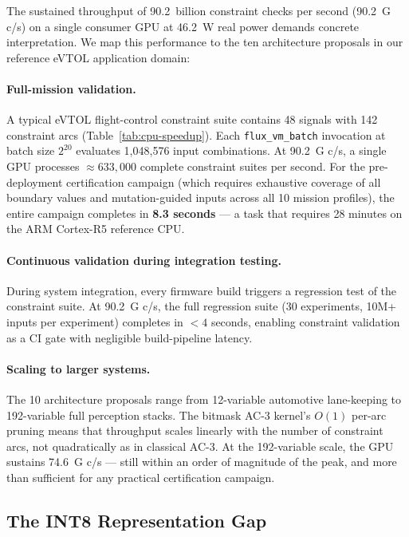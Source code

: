 \documentclass[conference]{IEEEtran}
\begin{document}
{The sustained throughput of 90.2~billion constraint checks per second
(90.2~G c/s) on a single consumer GPU at 46.2~W real power demands
concrete interpretation. We map this performance to the ten architecture
proposals in our reference eVTOL application domain:

\paragraph{Full-mission validation.}
A typical eVTOL flight-control constraint suite contains 48 signals
with 142 constraint arcs (Table~\ref{tab:cpu-speedup}). Each
\texttt{flux\_vm\_batch} invocation at batch size $2^{20}$ evaluates
1,048,576 input combinations. At 90.2~G c/s, a single GPU processes
$\approx 633{,}000$ complete constraint suites per second. For the
pre-deployment certification campaign (which requires exhaustive coverage
of all boundary values and mutation-guided inputs across all 10 mission
profiles), the entire campaign completes in \textbf{8.3 seconds} — a
task that requires 28 minutes on the ARM Cortex-R5 reference CPU.

\paragraph{Continuous validation during integration testing.}
During system integration, every firmware build triggers a regression
test of the constraint suite. At 90.2~G c/s, the full regression
suite (30 experiments, 10M+ inputs per experiment) completes in
$< 4$ seconds, enabling constraint validation as a CI gate with
negligible build-pipeline latency.

\paragraph{Scaling to larger systems.}
The 10 architecture proposals range from 12-variable automotive
lane-keeping to 192-variable full perception stacks. The bitmask AC-3
kernel's $O(1)$ per-arc pruning means that throughput scales linearly
with the number of constraint arcs, not quadratically as in classical
AC-3. At the 192-variable scale, the GPU sustains 74.6~G c/s — still
within an order of magnitude of the peak, and more than sufficient for
any practical certification campaign.

\subsection{The INT8 Representation Gap}
\label{sec:discuss-int8}

}
\end{document}
